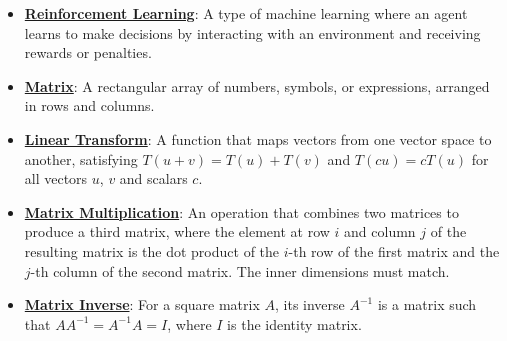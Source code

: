 \documentclass{article}%
\begin{document}
\begin{itemize}[leftmargin=*]
\item \href{https://purdue.brightspace.com/d2l/common/assets/pdfjs-d2l-dist/1.0.14-legacy/web/viewer.html?file=%2Fcontent%2Fenforced%2F1095467-wl.202510.CS.24300.001%2F02L2-Intro.pdf%3Fou%3D1095467&lang=en-us&container=d2l-fileviewer-rendered-pdf&fullscreen=d2l-fileviewer-rendered-pdf-dialog&height=667#page=46}{\textbf{Reinforcement Learning}}: A type of machine learning where an agent learns to make decisions by interacting with an environment and receiving rewards or penalties.%
\end{itemize}%
\begin{itemize}[leftmargin=*]%
\item \href{https://purdue.brightspace.com/d2l/common/assets/pdfjs-d2l-dist/1.0.14-legacy/web/viewer.html?file=%2Fcontent%2Fenforced%2F1095467-wl.202510.CS.24300.001%2F04L1-Linear Algebra Primer.pdf%3Fou%3D1095467&lang=en-us&container=d2l-fileviewer-rendered-pdf&fullscreen=d2l-fileviewer-rendered-pdf-dialog&height=667#page=4}{\textbf{Matrix}}: A rectangular array of numbers, symbols, or expressions, arranged in rows and columns.%
\item \href{https://purdue.brightspace.com/d2l/common/assets/pdfjs-d2l-dist/1.0.14-legacy/web/viewer.html?file=%2Fcontent%2Fenforced%2F1095467-wl.202510.CS.24300.001%2F04L1-Linear Algebra Primer.pdf%3Fou%3D1095467&lang=en-us&container=d2l-fileviewer-rendered-pdf&fullscreen=d2l-fileviewer-rendered-pdf-dialog&height=667#page=5}{\textbf{Linear Transform}}: A function that maps vectors from one vector space to another, satisfying $T(u + v) = T(u) + T(v)$ and $T(cu) = cT(u)$ for all vectors $u$, $v$ and scalars $c$.%
\item \href{https://purdue.brightspace.com/d2l/common/assets/pdfjs-d2l-dist/1.0.14-legacy/web/viewer.html?file=%2Fcontent%2Fenforced%2F1095467-wl.202510.CS.24300.001%2F04L1-Linear Algebra Primer.pdf%3Fou%3D1095467&lang=en-us&container=d2l-fileviewer-rendered-pdf&fullscreen=d2l-fileviewer-rendered-pdf-dialog&height=667#page=14}{\textbf{Matrix Multiplication}}: An operation that combines two matrices to produce a third matrix, where the element at row $i$ and column $j$ of the resulting matrix is the dot product of the $i$-th row of the first matrix and the $j$-th column of the second matrix. The inner dimensions must match.%
\item \href{https://purdue.brightspace.com/d2l/common/assets/pdfjs-d2l-dist/1.0.14-legacy/web/viewer.html?file=%2Fcontent%2Fenforced%2F1095467-wl.202510.CS.24300.001%2F04L1-Linear Algebra Primer.pdf%3Fou%3D1095467&lang=en-us&container=d2l-fileviewer-rendered-pdf&fullscreen=d2l-fileviewer-rendered-pdf-dialog&height=667#page=10}{\textbf{Matrix Inverse}}: For a square matrix $A$, its inverse $A^{-1}$ is a matrix such that $AA^{-1} = A^{-1}A = I$, where $I$ is the identity matrix.%

\end{itemize}
\end{document}
